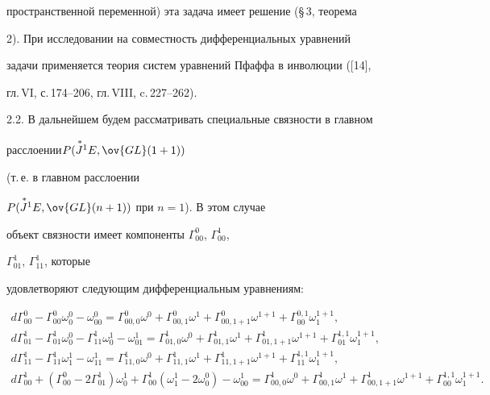пространственной переменной) эта задача имеет решение (\S\,3, теорема 


2). При исследовании на совместность дифференциальных уравнений 


задачи применяется теория систем уравнений Пфаффа в инволюции ([14], 


гл.\,VI, с.\,174--206, гл.\,VIII, c.\,227--262). 


 


2.2. В дальнейшем будем рассматривать специальные связности в главном 


расслоении\linebreak $P(\up{\,*}{J}^1 E,\ov{GL}(1+1))$ 


(т.\,е. в главном расслоении 


$P(\up{\,*}{J}^1 E,\ov{GL}(n+1))$ при $n=1$). В этом случае 


объект связности имеет компоненты $\Gamma^0_{00}$, $\Gamma^1_{00}$, 


$\Gamma^1_{01}$, $\Gamma^1_{11}$, которые 


удовлетворяют следующим дифференциальным уравнениям: 


\begin{gather*} 


d\Gamma^0_{00}-\Gamma^0_{00}\omega^0_0- 


\omega^0_{00}=\Gamma^0_{00,0}\omega^0+ 


\Gamma^0_{00,1}\omega^1+\Gamma^0_{00,1+1}\omega^{1+1}+ 


\Gamma^{0,1}_{00}\omega^{1+1}_1,\\ 


d\Gamma^1_{01}-\Gamma^1_{01}\omega^0_0-\Gamma^1_{11}\omega^1_0- 


\omega^1_{01}=\Gamma^1_{01,0}\omega^0+ 


\Gamma^1_{01,1}\omega^1+\Gamma^1_{01,1+1}\omega^{1+1}+ 


\Gamma^{1,1}_{01}\omega^{1+1}_1,\\ 


d\Gamma^1_{11}-\Gamma^1_{11}\omega^1_1-\omega^1_{11}= 


\Gamma^1_{11,0}\omega^0+\Gamma^1_{11,1}\omega^1+ 


\Gamma^1_{11,1+1}\omega^{1+1}+\Gamma^{1,1}_{11}\omega^{1+1}_1,\\ 


%


d\Gamma^1_{00}+(\Gamma^0_{00}-2\Gamma^1_{01})\omega^1_0+ 


\Gamma^1_{00}(\omega^1_1-2\omega^0_0)-\omega^1_{00}= 


\Gamma^1_{00,0}\omega^0+\Gamma^1_{00,1}\omega^1+ 


\Gamma^1_{00,1+1}\omega^{1+1}+\Gamma^{1,1}_{00}\omega^{1+1}_1.


\end{gather*} 


